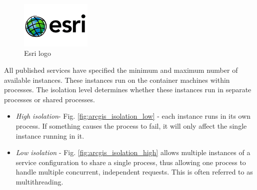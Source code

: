 \begin{figure}[h!]
\centering
\includegraphics[width=0.3\textwidth]{img/Intro_esri.png}
\caption{Esri logo}
\label{fig:geoserver_status}
\end{figure}

All published services have specified the minimum and maximum number of available instances. These instances run on the container machines within processes. The isolation level determines whether these instances run in separate processes or shared processes. 
\begin{itemize}
\item \textit{High isolation}- Fig. \ref{fig:arcgis_isolation_low} - each instance runs in its own process. If something causes the process to fail, it will only affect the single instance running in it.
\item \textit{Low isolation} - Fig. \ref{fig:arcgis_isolation_high} allows multiple instances of a service configuration to share a single process, thus allowing one process to handle multiple concurrent, independent requests. This is often referred to as multithreading.
\end{itemize} 

\begin{figure}[h!]
\centering
\begin{floatrow}
\end{floatrow}
\end{figure}

